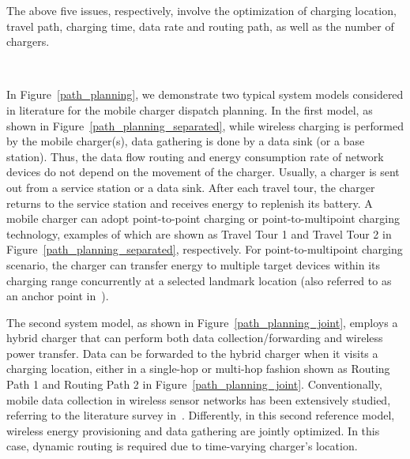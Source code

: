 \documentclass[twocolumn,10pt]{IEEEtran}
\begin{document}
The above five issues, respectively, involve the optimization of charging location, travel path, charging time, data rate and routing path, as well as the number of chargers. 

\begin{figure*} 
\centering
{}  
 \centering
 \\
\centering
\caption{Reference models of mobile charger dispatch.} 
\label{path_planning}
\end{figure*}

In Figure~\ref{path_planning}, we demonstrate two typical system models considered in literature for the mobile charger dispatch planning. In the first model, as shown in Figure~\ref{path_planning_separated}, while wireless charging is performed by the mobile charger(s), data gathering is done by a data sink (or a base station). Thus, the data flow routing and energy consumption rate of network devices do not depend on the movement of the charger. Usually, a charger is sent out from a service station or a data sink. After each travel tour, the charger returns to the service station and receives energy to replenish its battery. A mobile charger can adopt point-to-point charging or point-to-multipoint charging technology, examples of which are shown as Travel Tour 1 and Travel Tour 2 in Figure~\ref{path_planning_separated}, respectively. For point-to-multipoint charging scenario, the charger can transfer energy to multiple target devices within its charging range concurrently at a selected landmark location (also referred to as an anchor point in~\cite{S2014Guo, M2014Zhao}). 

The second system model, as shown in Figure~\ref{path_planning_joint}, employs a hybrid charger that can perform both data collection/forwarding and wireless power transfer. Data can be forwarded to the hybrid charger when it visits a charging location, either in a single-hop or multi-hop fashion shown as Routing Path 1 and Routing Path 2 in Figure~\ref{path_planning_joint}. Conventionally, mobile data collection in wireless sensor networks has been extensively studied, referring to the literature survey in~\cite{D.2011Francesco}. Differently, in this second reference model, wireless energy provisioning and data gathering are jointly optimized. In this case, dynamic routing is required due to time-varying charger's location.
 
\end{document}
